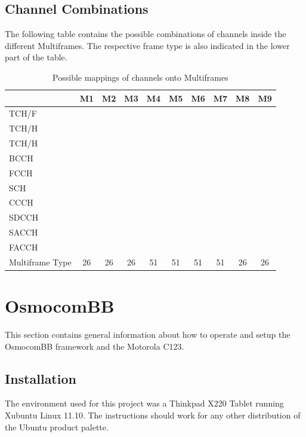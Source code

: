\newpage
\section{Channel Combinations}
\label{sec:combinations}
The following table contains the possible combinations of channels inside the different Multiframes.
The respective frame type is also indicated in the lower part of the table.
\begin{table}[h!]
\centering
\begin{tabular}{lccccccccc}
\toprule
					&M1&M2&M3&M4&M5&M6&M7&M8&M9\\
\midrule
TCH/F				&\cellcolor[gray]{0.7}&&&&&&&\cellcolor[gray]{0.7}&\cellcolor[gray]{0.7}\\
TCH/H				&&\cellcolor[gray]{0.7}&\cellcolor[gray]{0.7}&&&&&&\\
TCH/H				&&&\cellcolor[gray]{0.7}&&&&&&\\
BCCH				&&&&\cellcolor[gray]{0.7}&\cellcolor[gray]{0.7}&\cellcolor[gray]{0.7}&&&\\
FCCH				&&&&\cellcolor[gray]{0.7}&\cellcolor[gray]{0.7}&&&&\\
SCH					&&&&\cellcolor[gray]{0.7}&\cellcolor[gray]{0.7}&&&&\\
CCCH				&&&&\cellcolor[gray]{0.7}&\cellcolor[gray]{0.7}&\cellcolor[gray]{0.7}&&&\\
SDCCH				&&&&&\cellcolor[gray]{0.7}&&\cellcolor[gray]{0.7}&&\\
SACCH				&\cellcolor[gray]{0.7}&\cellcolor[gray]{0.7}&\cellcolor[gray]{0.7}&&\cellcolor[gray]{0.7}&&\cellcolor[gray]{0.7}&\cellcolor[gray]{0.7}&\cellcolor[gray]{0.7}\\
FACCH				&\cellcolor[gray]{0.7}&\cellcolor[gray]{0.7}&\cellcolor[gray]{0.7}&&&&&\cellcolor[gray]{0.7}&\\
\midrule
Multiframe Type		&26&26&26&51&51&51&51&26&26\\
\bottomrule
\end{tabular}
\caption{Possible mappings of channels onto Multiframes}
\end{table}


\chapter{OsmocomBB}
This section contains general information about how to operate and setup the OsmocomBB framework and the Motorola C123.
\section{Installation}
\label{sec:osmo_install}
The environment used for this project was a Thinkpad X220 Tablet running Xubuntu Linux 11.10.
The instructions should work for any other distribution of the Ubuntu product palette.

